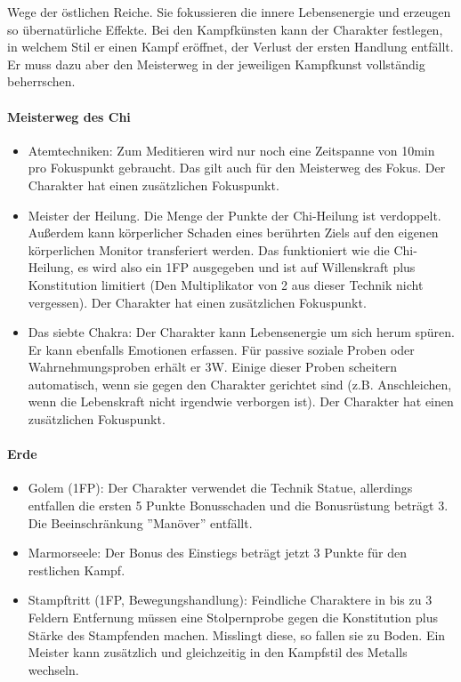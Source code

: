 \documentclass{article}
\begin{document}
Wege der östlichen Reiche. Sie fokussieren die innere Lebensenergie und erzeugen so übernatürliche Effekte.
Bei den Kampfkünsten kann der Charakter festlegen, in welchem Stil er einen Kampf eröffnet, der Verlust der ersten
Handlung entfällt. Er muss dazu aber den Meisterweg in der jeweiligen Kampfkunst vollständig beherrschen.

\paragraph{Meisterweg des Chi}

\begin{itemize}
\item Atemtechniken: Zum Meditieren wird nur noch eine Zeitspanne von 10min pro Fokuspunkt gebraucht. Das gilt auch für den Meisterweg des Fokus. Der Charakter hat einen zusätzlichen Fokuspunkt.
\item Meister der Heilung. Die Menge der Punkte der Chi-Heilung ist verdoppelt. Außerdem kann körperlicher Schaden eines berührten Ziels auf den eigenen körperlichen Monitor transferiert werden. Das funktioniert wie die Chi-Heilung, es wird also ein 1FP ausgegeben und ist auf Willenskraft plus Konstitution limitiert (Den Multiplikator von 2 aus dieser Technik nicht vergessen). Der Charakter hat einen zusätzlichen Fokuspunkt.
\item Das siebte Chakra: Der Charakter kann Lebensenergie um sich herum spüren. Er kann ebenfalls Emotionen erfassen. Für passive soziale Proben oder Wahrnehmungsproben erhält er 3W. Einige dieser Proben scheitern automatisch, wenn sie gegen den Charakter gerichtet sind (z.B. Anschleichen, wenn die Lebenskraft nicht irgendwie verborgen ist). Der Charakter hat einen zusätzlichen Fokuspunkt.
\end{itemize}

\paragraph{Erde}

\begin{itemize}
\item Golem (1FP): Der Charakter verwendet die Technik Statue, allerdings entfallen die ersten 5 Punkte Bonusschaden und die Bonusrüstung beträgt 3. Die Beeinschränkung ''Manöver'' entfällt.
\item Marmorseele: Der Bonus des Einstiegs beträgt jetzt 3 Punkte für den restlichen Kampf.
\item Stampftritt (1FP, Bewegungshandlung): Feindliche Charaktere in bis zu 3 Feldern Entfernung müssen eine Stolpernprobe gegen die Konstitution plus Stärke des Stampfenden machen. Misslingt diese, so fallen sie zu Boden. Ein Meister kann zusätzlich und gleichzeitig in den Kampfstil des Metalls wechseln.
\end{itemize}
\end{document}
